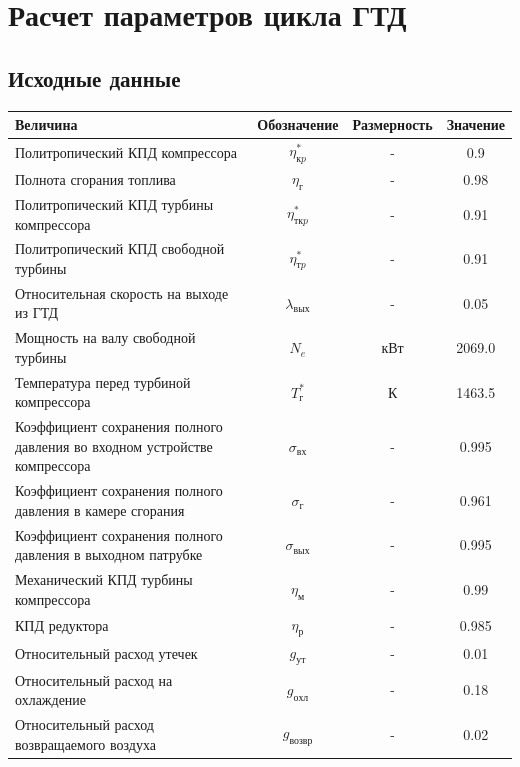 \documentclass[a4paper,10pt]{article}
\begin{document}
\tableofcontents
\newpage

\section{Расчет параметров цикла ГТД}

\subsection{Исходные данные}
\begin{center}
	\begin{tabular}{|p{7cm}|c|c|c|}
		\hline
		\textbf{Величина} & \textbf{Обозначение} & \textbf{Размерность} & \textbf{Значение} \\ \hline
		Политропический КПД компрессора & $\eta_{кp}^*$ & - & 0.9 \\ \hline
		Полнота сгорания топлива & $\eta_г$ & - & 0.98 \\ \hline
		Политропический КПД турбины компрессора & $\eta_{ткp}^*$ & - & 0.91 \\ \hline
		Политропический КПД свободной турбины & $\eta_{тp}^*$ & - & 0.91 \\ \hline
		Относительная скорость на выходе из ГТД & $\lambda_{вых}$ & - & 0.05 \\ \hline
		Мощность на валу свободной турбины & $N_e$ & кВт & 2069.0 \\ \hline
		Температура перед турбиной компрессора & $T_г^*$ & К & 1463.5 \\ \hline
		Коэффициент сохранения полного давления во входном устройстве компрессора & $\sigma_{вх}$ & - & 0.995 \\ \hline
		Коэффициент сохранения полного давления в камере сгорания & $\sigma_{г}$ & - & 0.961 \\ \hline
		Коэффициент сохранения полного давления в выходном патрубке & $\sigma_{вых}$ & - & 0.995 \\ \hline
		Механический КПД турбины компрессора & $\eta_м$ & - & 0.99 \\ \hline
		КПД редуктора & $\eta_р$ &  - & 0.985 \\ \hline
		Относительный расход утечек & $g_{ут}$ &  - &0.01 \\ \hline
		Относительный расход на охлаждение & $g_{охл}$ &  - & 0.18 \\ \hline
		Относительный расход возвращаемого воздуха & $g_{возвр}$ & - & 0.02 \\ \hline
	\end{tabular}
\end{center}
\end{document}
